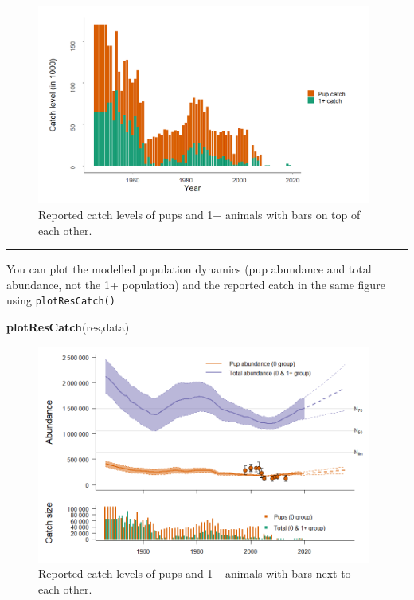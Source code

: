 \documentclass[
]{article}
\newenvironment{Shaded}{\begin{snugshade}}{\end{snugshade}}
\newcommand{\KeywordTok}[1]{\textcolor[rgb]{0.13,0.29,0.53}{\textbf{#1}}}
\newcommand{\NormalTok}[1]{#1}
\begin{document}
\begin{figure}
\centering
\includegraphics[width=0.98\textwidth,height=\textheight]{figures/catch_data_stack_new.png}
\caption{Reported catch levels of pups and 1+ animals with bars on top
of each other.}
\end{figure}

\begin{center}\rule{0.5\linewidth}{0.5pt}\end{center}

You can plot the modelled population dynamics (pup abundance and total
abundance, not the 1+ population) and the reported catch in the same
figure using \texttt{plotResCatch()}

\begin{Shaded}
\begin{Highlighting}[]
\KeywordTok{plotResCatch}\NormalTok{(res,data)}
\end{Highlighting}
\end{Shaded}

\begin{figure}
\centering
\includegraphics[width=0.98\textwidth,height=\textheight]{figures/plotResCatch2.png}
\caption{Reported catch levels of pups and 1+ animals with bars next to
each other.}
\end{figure}
\end{document}
